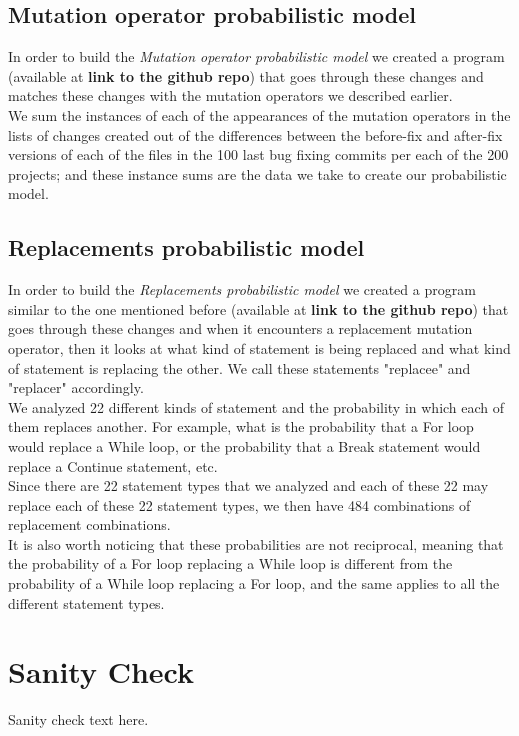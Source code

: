 \documentclass[conference]{IEEEtran}
\newcommand{\todo}[1]
  {{\scriptsize \textbf{\color{red} {#1}}}}
\begin{document}
\subsection{Mutation operator probabilistic model}
In order to build the \textit{Mutation operator probabilistic model} we created a program (available at \todo{link to the github repo}) that goes through these changes and matches these changes with the mutation operators we described earlier.\\
We sum the instances of each of the appearances of the mutation operators in the lists of changes created out of the differences between the before-fix and after-fix versions of each of the files in the 100 last bug fixing commits per each of the 200 projects; and these instance sums are the data we take to create our probabilistic model.\\  


\subsection{Replacements probabilistic model}
In order to build the \textit{Replacements probabilistic model} we created a program similar to the one mentioned before (available at \todo{link to the github repo}) that goes through these changes and when it encounters a replacement mutation operator, then it looks at what kind of statement is being replaced and what kind of statement is replacing the other. We call these statements "replacee" and "replacer" accordingly.\\
We analyzed 22 different kinds of statement and the probability in which each of them replaces another. For example, what is the probability that a For loop would replace a While loop, or the probability that a Break statement would replace a Continue statement, etc.\\
Since there are 22 statement types that we analyzed and each of these 22 may replace each of these 22 statement types, we then have 484 combinations of replacement combinations. \\
It is also worth noticing that these probabilities are not reciprocal, meaning that the probability of a For loop replacing a While loop is different from the probability of a While loop replacing a For loop, and the same applies to all the different statement types.\\

\section{Sanity Check}
Sanity check text here.
\end{document}
